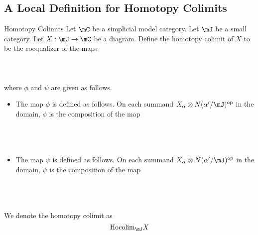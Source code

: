 \documentclass[a4paper]{article}
\begin{document}
\subsection{A Local Definition for Homotopy Colimits}
\begin{defn}{Homotopy Colimits}{} Let $\mC$ be a simplicial model category. Let $\mJ$ be a small category. Let $X:\mJ\to\mC$ be a diagram. Define the homotopy colimit of $X$ to be the coequalizer of the maps \\~\\
\\~\\
where $\phi$ and $\psi$ are given as follows. 
\begin{itemize}
\item The map $\phi$ is defined as follows. On each summand $X_\alpha\otimes N(\alpha'/\mJ)^\text{op}$ in the domain, $\phi$ is the composition of the map \\~\\
\\~\\
\item The map $\psi$ is defined as follows. On each summand $X_\alpha\otimes N(\alpha'/\mJ)^\text{op}$ in the domain, $\psi$ is the composition of the map \\~\\
\\~\\
\end{itemize}
We denote the homotopy colimit as $$\text{Hocolim}_\mJ X$$
\end{defn}
\end{document}
